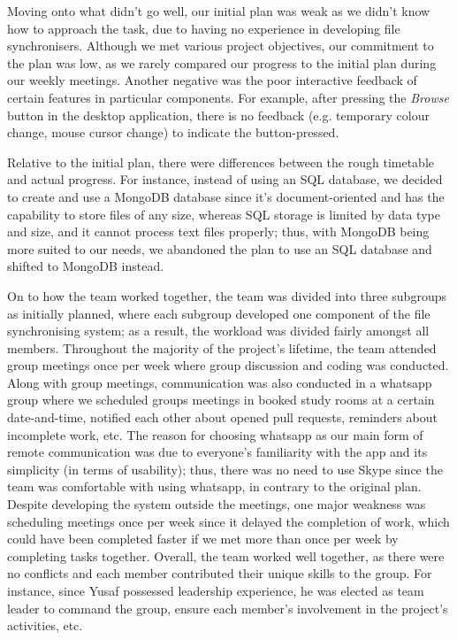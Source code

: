 \documentclass{article}
\begin{document}
\noindent Moving onto what didn't go well, our initial plan was weak as we didn't know how to approach the task, due to having no experience in developing file synchronisers. Although we met various project objectives, our commitment to the plan was low, as we rarely compared our progress to the initial plan during our weekly meetings. Another negative was the poor interactive feedback of certain features in particular components. For example, after pressing the \textit{Browse} button in the desktop application, there is no feedback (e.g. temporary colour change, mouse cursor change) to indicate the button-pressed.

\noindent Relative to the initial plan, there were differences between the rough timetable and actual progress. For instance, instead of using an SQL database, we decided to create and use a MongoDB database since it's document-oriented and has the capability to store files of any size, whereas SQL storage is limited by data type and size, and it cannot process text files properly; thus, with MongoDB being more suited to our needs, we abandoned the plan to use an SQL database and shifted to MongoDB instead.

\noindent On to how the team worked together, the team was divided into three subgroups as initially planned, where each subgroup developed one component of the file synchronising system; as a result, the workload was divided fairly amongst all members. Throughout the majority of the project's lifetime, the team attended group meetings once per week where group discussion and coding was conducted. Along with group meetings, communication was also conducted in a whatsapp group where we scheduled groups meetings in booked study rooms at a certain date-and-time, notified each other about opened pull requests, reminders about incomplete work, etc. The reason for choosing whatsapp as our main form of remote communication was due to everyone's familiarity with the app and its simplicity (in terms of usability); thus, there was no need to use Skype since the team was comfortable with using whatsapp, in contrary to the original plan. Despite developing the system outside the meetings, one major weakness was scheduling meetings once per week since it delayed the completion of work, which could have been completed faster if we met more than once per week by completing tasks together. Overall, the team worked well together, as there were no conflicts and each member contributed their unique  skills to the group. For instance, since Yusaf possessed leadership experience, he was elected as team leader to command the group, ensure each member's involvement in the project's activities, etc.
\end{document}
